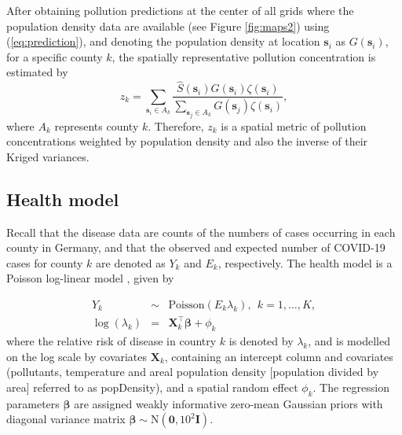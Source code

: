 \documentclass[12,]{article}
\begin{document}
After obtaining pollution predictions at the center of all grids where
the population density data are available (see Figure \ref{fig:maps2})
using (\ref{eq:prediction}), and denoting the population density at
location \(\symbf{s}_i\) as \(G(\symbf{s}_i)\), for a specific county
\(k\), the spatially representative pollution concentration is estimated
by \begin{equation}
z_k = \sum_{\symbf{s}_i \in A_k}\frac{\hat{S}(\symbf{s}_i)G(\symbf{s}_i)\zeta(\symbf{s}_i)}{\sum_{\symbf{s}_j \in A_k} G(\symbf{s}_j)\zeta(\symbf{s}_i)},
\label{eq:arealEstimate}
\end{equation} where \(A_k\) represents county \(k\). Therefore, \(z_k\)
is a spatial metric of pollution concentrations weighted by population
density and also the inverse of their Kriged variances.

\hypertarget{sec:healthModel}{%
\subsection{Health model}\label{sec:healthModel}}

Recall that the disease data are counts of the numbers of cases
occurring in each county in Germany, and that the observed and expected
number of COVID-19 cases for county \(k\) are denoted as \(Y_{k}\) and
\(E_{k}\), respectively. The health model is a Poisson log-linear model
\autocite[see][]{Shaddick2015}, given by

\begin{eqnarray}\label{eq:healthmodel}
Y_{k}  &\sim & \mbox{Poisson}(E_{k}\lambda_{k}),~~k=1,\ldots,K,\\\nonumber
\log(\lambda_{k}) &=& \symbf{X}_{k}^{\top}\symbf{\beta}+\phi_{k}
\end{eqnarray} where the relative risk of disease in country \(k\) is
denoted by \(\lambda_{k}\), and is modelled on the log scale by
covariates \(\symbf{X}_{k}\), containing an intercept column and
covariates (pollutants, temperature and areal population density
{[}population divided by area{]} referred to as popDensity), and a
spatial random effect \(\phi_{k}\). The regression parameters
\(\symbf{\beta}\) are assigned weakly informative zero-mean Gaussian
priors with diagonal variance matrix
\(\symbf{\beta}\sim \mbox{N}\left(\symbf{0},10^2\symbf{I} \right)\).
\end{document}
